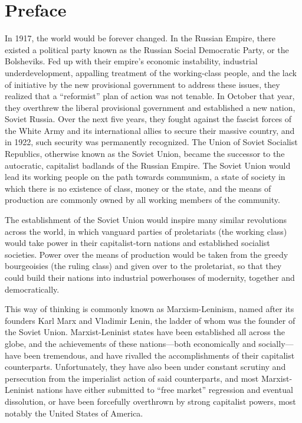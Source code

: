 \chapter{Preface}
In 1917, the world would be forever changed.
In the Russian Empire, there existed a political party known as the Russian Social Democratic Party, or the Bolsheviks.
Fed up with their empire's economic instability, industrial underdevelopment, appalling treatment of the working-class people, and the lack of initiative by the new provisional government to address these issues, they realized that a ``reformist'' plan of action was not tenable.
In October that year, they overthrew the liberal provisional government and established a new nation, Soviet Russia.
Over the next five years, they fought against the fascist forces of the White Army and its international allies to secure their massive country, and in 1922, such security was permanently recognized.
The Union of Soviet Socialist Republics, otherwise known as the Soviet Union, became the successor to the autocratic, capitalist badlands of the Russian Empire.
The Soviet Union would lead its working people on the path towards communism, a state of society in which there is no existence of class, money or the state, and the means of production are commonly owned by all working members of the community. 
 
The establishment of the Soviet Union would inspire many similar revolutions across the world, in which vanguard parties of proletariats (the working class) would take power in their capitalist-torn nations and established socialist societies.
Power over the means of production would be taken from the greedy bourgeoisies (the ruling class) and given over to the proletariat, so that they could build their nations into industrial powerhouses of modernity, together and democratically. 
 
This way of thinking is commonly known as Marxism-Leninism, named after its founders Karl Marx and Vladimir Lenin, the ladder of whom was the founder of the Soviet Union.
Marxist-Leninist states have been established all across the globe, and the achievements of these nations---both economically and socially---have been tremendous, and have rivalled the accomplishments of their capitalist counterparts.
Unfortunately, they have also been under constant scrutiny and persecution from the imperialist action of said counterparts, and most Marxist-Leninist nations have either submitted to ``free market'' regression and eventual dissolution, or have been forcefully overthrown by strong capitalist powers, most notably the United States of America. 
 
